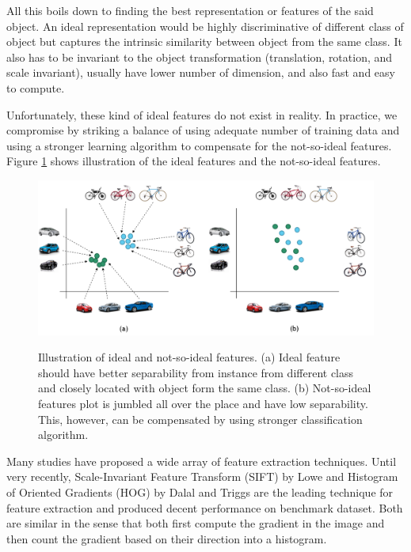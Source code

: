 \documentclass[a4paper,11pt]{kth-mag}
\begin{document}
All this boils down to finding the best representation or features of the said object. An ideal representation would be highly discriminative of different class of object but captures the intrinsic similarity between object from the same class. It also has to be invariant to the object transformation (translation, rotation, and scale invariant), usually have lower number of dimension, and also fast and easy to compute.

Unfortunately, these kind of ideal features do not exist in reality. In practice, we compromise by striking a balance of using adequate number of training data and using a stronger learning algorithm to compensate for the not-so-ideal features. Figure \ref{fig:feature} shows illustration of the ideal features and the not-so-ideal features.

\begin{figure}[h]
\centering
\includegraphics[scale=0.4]{image/ideal_feature.png}
\label{fig:feature}
\caption{Illustration of ideal and not-so-ideal features. (a) Ideal feature should have better separability from instance from different class and closely located with object form the same class. (b) Not-so-ideal features plot is jumbled all over the place and have low separability. This, however, can be compensated by using stronger classification algorithm.}
\end{figure}

Many studies have proposed a wide array of feature extraction techniques. Until very recently, Scale-Invariant Feature Transform (SIFT) by Lowe \cite{lowe2004sift} and Histogram of Oriented Gradients (HOG) by Dalal and Triggs \cite{dalal2005hog} are the leading technique for feature extraction and produced decent performance on benchmark dataset. Both are similar in the sense that both first compute the gradient in the image and then count the gradient based on their direction into a histogram.
\end{document}
